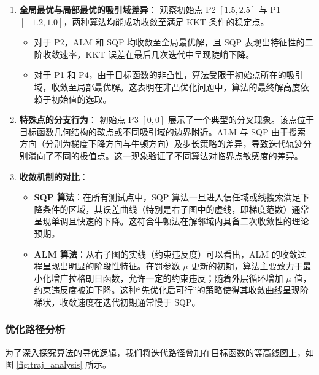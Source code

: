 \documentclass[a4paper,12pt]{article}
\begin{document}
\begin{enumerate}
    \item \textbf{全局最优与局部最优的吸引域差异}：
    观察初始点 P2 $[1.5, 2.5]$ 与 P1 $[-1.2, 1.0]$，两种算法均能成功收敛至满足 KKT 条件的稳定点。
    \begin{itemize}
        \item 对于 P2，ALM 和 SQP 均收敛至全局最优解，且 SQP 表现出特征性的二阶收敛速率，KKT 误差在最后几次迭代中呈现陡峭下降。
        \item 对于 P1 和 P4，由于目标函数的非凸性，算法受限于初始点所在的吸引域，收敛至局部最优解。这表明在非凸优化问题中，算法的最终解高度依赖于初始值的选取。
    \end{itemize}

    \item \textbf{特殊点的分支行为}：
    初始点 P3 $[0, 0]$ 展示了一个典型的分叉现象。该点位于目标函数几何结构的鞍点或不同吸引域的边界附近。ALM 与 SQP 由于搜索方向（分别为梯度下降方向与牛顿方向）及步长策略的差异，导致迭代轨迹分别滑向了不同的极值点。这一现象验证了不同算法对临界点敏感度的差异。

    \item \textbf{收敛机制的对比}：
    \begin{itemize}
        \item \textbf{SQP 算法}：在所有测试点中，SQP 算法一旦进入信任域或线搜索满足下降条件的区域，其误差曲线（特别是右子图中的虚线，即梯度范数）通常呈现单调且快速的下降。这符合牛顿法在解邻域内具备二次收敛性的理论预期。
        \item \textbf{ALM 算法}：从右子图的实线（约束违反度）可以看出，ALM 的收敛过程呈现出明显的阶段性特征。在罚参数 $\mu$ 更新的初期，算法主要致力于最小化增广拉格朗日函数，允许一定的约束违反；随着外层循环增加 $\mu$ 值，约束违反度被迫下降。这种“先优化后可行”的策略使得其收敛曲线呈现阶梯状，收敛速度在迭代初期通常慢于 SQP。
    \end{itemize}
\end{enumerate}



\subsubsection{优化路径分析}

为了深入探究算法的寻优逻辑，我们将迭代路径叠加在目标函数的等高线图上，如图 \ref{fig:traj_analysis} 所示。
\end{document}

